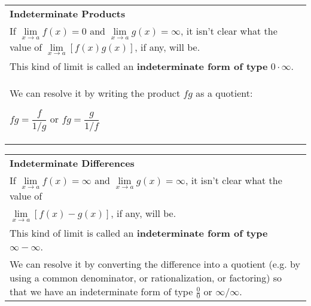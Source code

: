 \documentclass{article}
\begin{document}
\begin{center}
\large
\def\arraystretch{1.3}
{\setlength{\tabcolsep}{16pt}
\begin{tabularx}{.9\textwidth}{|X|}
\hline
	\vspace{1pt}
	\textbf{Indeterminate Products} \: \\\vspace{1pt}
	If $\underset{x \to a}{\lim} f(x)=0$ and $\underset{x \to a}{\lim} g(x)=\infty$, it isn't clear what the value of $\underset{x \to a}{\lim} [f(x) g(x)]$, if any, will be.  \\\vspace{1pt} 
	This kind of limit is called an \textbf{indeterminate form of type} \textbf{$0 \cdot \infty$}. \\ 
	We can resolve it by writing the product $fg$ as a quotient: 
	\begin{center}
	$fg = \dfrac{f}{1/g}$ \hspace{12pt} or \hspace{12pt} $fg = \dfrac{g}{1/f}$
	\end{center}
	\\
	\hline
\end{tabularx}}
\end{center}

\begin{center}
\large
\def\arraystretch{1.3}
{\setlength{\tabcolsep}{16pt}
\begin{tabularx}{.9\textwidth}{|X|}
\hline
	\vspace{1pt}
	\textbf{Indeterminate Differences} \: \\\vspace{1pt}
	If $\underset{x \to a}{\lim} f(x)=\infty$ and $\underset{x \to a}{\lim} g(x)=\infty$, it isn't clear what the value of \\
	$\underset{x \to a}{\lim} [f(x) - g(x)]$, if any, will be.  \\\vspace{1pt} 
	This kind of limit is called an \textbf{indeterminate form of type} \textbf{$\infty - \infty$}. \\\vspace{1pt} 
	We can resolve it by converting the difference into a quotient (e.g. by using a common denominator, or rationalization, or factoring) so that we have an indeterminate form of type $\frac{0}{0}$ or $\infty / \infty$.
	\\[12pt]
	\hline
\end{tabularx}}
\end{center}
\pagebreak
\end{document}

